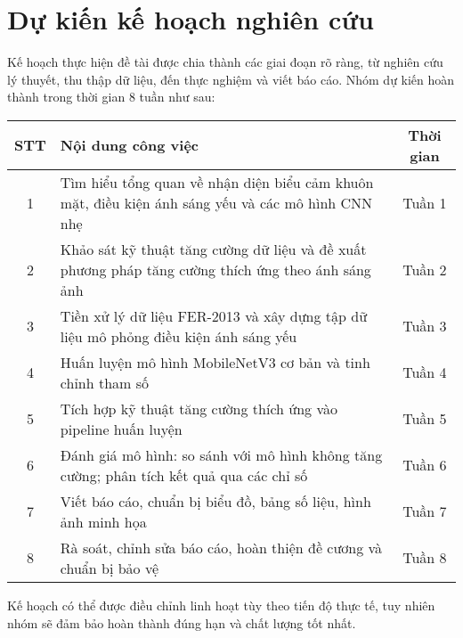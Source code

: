 \section{Dự kiến kế hoạch nghiên cứu} %

Kế hoạch thực hiện đề tài được chia thành các giai đoạn rõ ràng, từ nghiên cứu lý thuyết, thu thập dữ liệu, đến thực nghiệm và viết báo cáo. Nhóm dự kiến hoàn thành trong thời gian 8 tuần như sau:

\begin{center}
\renewcommand{\arraystretch}{1.5}
\begin{tabular}{|c|p{8cm}|c|}
    \hline
    \textbf{STT} & \centering \textbf{Nội dung công việc} & \textbf{Thời gian} \\ \hline
    1 & Tìm hiểu tổng quan về nhận diện biểu cảm khuôn mặt, điều kiện ánh sáng yếu và các mô hình CNN nhẹ & Tuần 1 \\ \hline
    2 & Khảo sát kỹ thuật tăng cường dữ liệu và đề xuất phương pháp tăng cường thích ứng theo ánh sáng ảnh & Tuần 2 \\ \hline
    3 & Tiền xử lý dữ liệu FER-2013 và xây dựng tập dữ liệu mô phỏng điều kiện ánh sáng yếu & Tuần 3 \\ \hline
    4 & Huấn luyện mô hình MobileNetV3 cơ bản và tinh chỉnh tham số & Tuần 4 \\ \hline
    5 & Tích hợp kỹ thuật tăng cường thích ứng vào pipeline huấn luyện & Tuần 5 \\ \hline
    6 & Đánh giá mô hình: so sánh với mô hình không tăng cường; phân tích kết quả qua các chỉ số & Tuần 6 \\ \hline
    7 & Viết báo cáo, chuẩn bị biểu đồ, bảng số liệu, hình ảnh minh họa & Tuần 7 \\ \hline
    8 & Rà soát, chỉnh sửa báo cáo, hoàn thiện đề cương và chuẩn bị bảo vệ & Tuần 8 \\ \hline
\end{tabular}
\end{center}

Kế hoạch có thể được điều chỉnh linh hoạt tùy theo tiến độ thực tế, tuy nhiên nhóm sẽ đảm bảo hoàn thành đúng hạn và chất lượng tốt nhất.